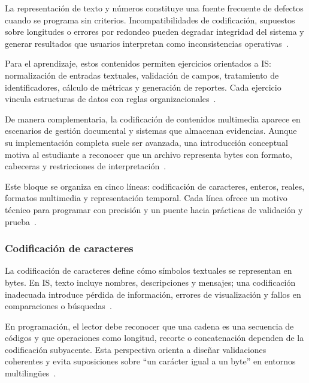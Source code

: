 \documentclass[12pt,twoside]{book}
\begin{document}
					La representación de texto y números constituye una fuente frecuente de defectos cuando se programa sin criterios. Incompatibilidades de codificación, supuestos sobre longitudes o errores por redondeo pueden degradar integridad del sistema y generar resultados que usuarios interpretan como inconsistencias operativas~\cite{ISO247722024Programming,Goldberg1991What,IEEE2019Standard754}.
					
					Para el aprendizaje, estos contenidos permiten ejercicios orientados a IS: normalización de entradas textuales, validación de campos, tratamiento de identificadores, cálculo de métricas y generación de reportes. Cada ejercicio vincula estructuras de datos con reglas organizacionales~\cite{Gaddis2022Starting,Hanly2015Problem,Kendall2014Systems}.
					
					De manera complementaria, la codificación de contenidos multimedia aparece en escenarios de gestión documental y sistemas que almacenan evidencias. Aunque su implementación completa suele ser avanzada, una introducción conceptual motiva al estudiante a reconocer que un archivo representa bytes con formato, cabeceras y restricciones de interpretación~\cite{Tanenbaum2021Structured,Silberschatz2018Operating,Laudon2020Management}.
					
					Este bloque se organiza en cinco líneas: codificación de caracteres, enteros, reales, formatos multimedia y representación temporal. Cada línea ofrece un motivo técnico para programar con precisión y un puente hacia prácticas de validación y prueba~\cite{Sommerville2015Software,Ghezzi2003Fundamentals,Pressman2019Software}.
					
					\subsubsection{Codificación de caracteres}
						\noindent
						La codificación de caracteres define cómo símbolos textuales se representan en bytes. En IS, texto incluye nombres, descripciones y mensajes; una codificación inadecuada introduce pérdida de información, errores de visualización y fallos en comparaciones o búsquedas~\cite{Laudon2020Management,ISO247722024Programming,Silberschatz2018Operating}.
						
						En programación, el lector debe reconocer que una cadena es una secuencia de códigos y que operaciones como longitud, recorte o concatenación dependen de la codificación subyacente. Esta perspectiva orienta a diseñar validaciones coherentes y evita suposiciones sobre “un carácter igual a un byte” en entornos multilingües~\cite{Gaddis2022Starting,Hanly2015Problem,Sebesta2018Concepts}.
						
\end{document}

